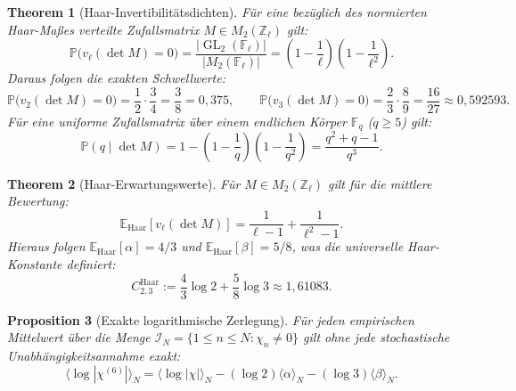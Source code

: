 \documentclass[11pt,a4paper]{article}
\theoremstyle{plain}
\newtheorem{theorem}{Theorem}[section]
\newtheorem{proposition}[theorem]{Proposition}
\theoremstyle{definition}
\theoremstyle{remark}
\DeclareMathOperator{\GL}{GL}
\begin{document}
\begin{theorem}[Haar-Invertibilitätsdichten]
Für eine bezüglich des normierten Haar-Maßes verteilte Zufallsmatrix $M \in M_2(\mathbb{Z}_\ell)$ gilt:
\begin{equation}
\mathbb{P}\bigl(v_\ell(\det M) = 0\bigr) = \frac{|\GL_2(\mathbb{F}_\ell)|}{|M_2(\mathbb{F}_\ell)|} = \left(1 - \frac{1}{\ell}\right)\left(1 - \frac{1}{\ell^2}\right).
\end{equation}
Daraus folgen die exakten Schwellwerte:
\begin{equation}
\mathbb{P}\bigl(v_2(\det M) = 0\bigr) = \frac{1}{2} \cdot \frac{3}{4} = \frac{3}{8} = 0{,}375, \qquad \mathbb{P}\bigl(v_3(\det M) = 0\bigr) = \frac{2}{3} \cdot \frac{8}{9} = \frac{16}{27} \approx 0{,}592593.
\end{equation}
Für eine uniforme Zufallsmatrix über einem endlichen Körper $\mathbb{F}_q$ ($q \ge 5$) gilt:
\begin{equation}
\mathbb{P}(q \mid \det M) = 1 - \left(1 - \frac{1}{q}\right)\left(1 - \frac{1}{q^2}\right) = \frac{q^2 + q - 1}{q^3}.
\end{equation}
\end{theorem}

\begin{theorem}[Haar-Erwartungswerte]
Für $M \in M_2(\mathbb{Z}_\ell)$ gilt für die mittlere Bewertung:
\begin{equation}
\mathbb{E}_{\mathrm{Haar}}[v_\ell(\det M)] = \frac{1}{\ell - 1} + \frac{1}{\ell^2 - 1}.
\end{equation}
Hieraus folgen $\mathbb{E}_{\mathrm{Haar}}[\alpha] = 4/3$ und $\mathbb{E}_{\mathrm{Haar}}[\beta] = 5/8$, was die universelle Haar-Konstante definiert:
\begin{equation}
C_{2,3}^{\mathrm{Haar}} := \frac{4}{3}\log 2 + \frac{5}{8}\log 3 \approx 1{,}61083.
\end{equation}
\end{theorem}

\begin{proposition}[Exakte logarithmische Zerlegung]
Für jeden empirischen Mittelwert über die Menge $\mathcal{I}_N = \{1 \le n \le N : \chi_n \neq 0\}$ gilt ohne jede stochastische Unabhängigkeitsannahme exakt:
\begin{equation}
\langle \log |\chi^{(6)}| \rangle_N = \langle \log |\chi| \rangle_N - (\log 2)\langle \alpha \rangle_N - (\log 3)\langle \beta \rangle_N.
\end{equation}
\end{proposition}
\end{document}
